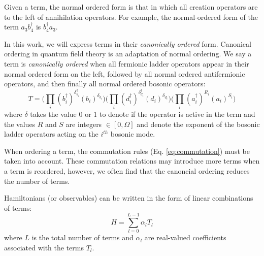 Given a term, the normal ordered form is that in which all creation operators are to the left of annihilation operators.
For example, the normal-ordered form of the term $a_3 b_4^\dagger$ is $b_4^\dagger a_3$.

In this work, we will express terms in their \emph{canonically ordered} form.
Canonical ordering in quantum field theory is an adaptation of normal ordering.
We say a term is \textit{canonically ordered} when all fermionic ladder operators appear in their normal ordered form on the left, followed by all normal ordered antifermionic operators, and then finally all normal ordered bosonic operators:
\begin{equation}
    T = \Big( \prod_i (b_i^\dagger)^{\delta_{b_i}^{\dagger}} (b_i)^{\delta_{b_i}} \Big) \Big( \prod_i (d_i^\dagger)^{\delta_{d_i}^{\dagger}} (d_i)^{\delta_{d_i}} \Big)   \Big( \prod_i (a_i^\dagger)^{R_i}(a_i)^{S_i} \Big) 
\end{equation}
where $\delta$ takes the value $0$ or $1$ to denote if the operator is active in the term and the values $R$ and $S$ are integers $\in [0, \Omega]$ and denote the exponent of the bosonic ladder operators acting on the $i^{th}$ bosonic mode.

When ordering a term, the commutation rules (Eq. \ref{eq:commutation}) must be taken into account.
These commutation relations may introduce more terms when a term is reordered, however, we often find that the canoncial ordering reduces the number of terms.


Hamiltonians (or observables) can be written in the form of linear combinations of terms:
\begin{equation}
    \label{eq:lclo}
    H = \sum_{l=0}^{L-1} \alpha_l T_l
\end{equation}
where $L$ is the total number of terms and $\alpha_l$ are real-valued coefficients associated with the terms $T_l$.
